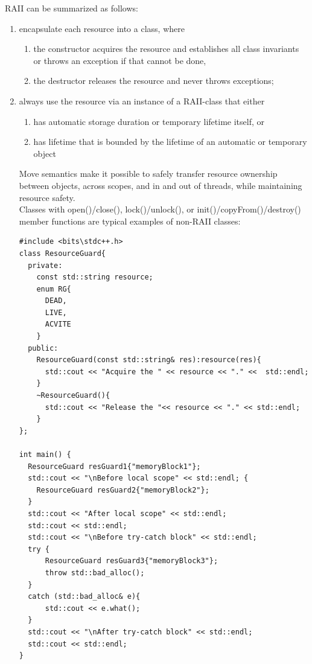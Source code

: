 \documentclass[a4paper]{exam}
\theoremstyle{definition}
\begin{document}
RAII can be summarized as follows:
\begin{enumerate}
  \item encapsulate each resource into a class, where
  \begin{enumerate}
    \item the constructor acquires the resource and establishes all class invariants or throws an exception if that cannot be done,
    \item the destructor releases the resource and never throws exceptions;
    
  \end{enumerate}
  \item always use the resource via an instance of a RAII-class that either
  \begin{enumerate}
    \item has automatic storage duration or temporary lifetime itself, or
\item    has lifetime that is bounded by the lifetime of an automatic or temporary object
  \end{enumerate}
  Move semantics make it possible to safely transfer resource ownership between objects, across scopes, and in and out of threads, while maintaining resource safety.
\\
  Classes with open()/close(), lock()/unlock(), or init()/copyFrom()/destroy() member functions are typical examples of non-RAII classes:

  \begin{verbatim}
#include <bits\stdc++.h>
class ResourceGuard{
  private:
    const std::string resource;
    enum RG{
      DEAD,
      LIVE,
      ACVITE
    }
  public:
    ResourceGuard(const std::string& res):resource(res){
      std::cout << "Acquire the " << resource << "." <<  std::endl;
    }
    ~ResourceGuard(){
      std::cout << "Release the "<< resource << "." << std::endl;
    }
};

int main() {
  ResourceGuard resGuard1{"memoryBlock1"};
  std::cout << "\nBefore local scope" << std::endl; {
    ResourceGuard resGuard2{"memoryBlock2"};
  }
  std::cout << "After local scope" << std::endl;
  std::cout << std::endl;
  std::cout << "\nBefore try-catch block" << std::endl;
  try {
      ResourceGuard resGuard3{"memoryBlock3"};
      throw std::bad_alloc();
  }   
  catch (std::bad_alloc& e){
      std::cout << e.what();
  }
  std::cout << "\nAfter try-catch block" << std::endl;
  std::cout << std::endl;
}
  \end{verbatim}
\end{enumerate}
\end{document}
